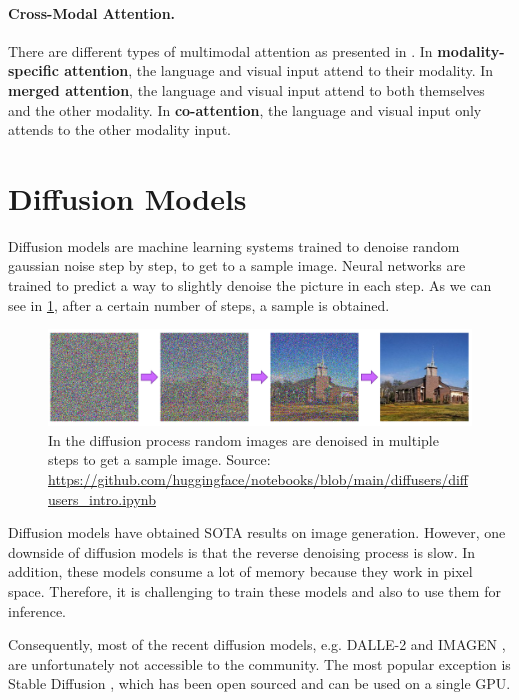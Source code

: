 \paragraph{Cross-Modal Attention.} There are different types of multimodal attention as presented in \cite{hendricks2021decoupling}. In \textbf{modality-specific attention}, the language and visual input attend to their modality. In \textbf{merged attention}, the language and visual input attend to both themselves and the other modality. In \textbf{co-attention}, the language and visual input only attends to the other modality input.

\section{Diffusion Models} \label{sec:diffusion_models}

Diffusion models are machine learning systems trained to denoise random gaussian noise step by step, to get to a sample image. Neural networks are trained to predict a way to slightly denoise the picture in each step. As we can see in \cref{fig:diffusion_process}, after a certain number of steps, a sample is obtained.

\begin{figure}[ht]
    \centering
    \includegraphics[width=\linewidth]{images/diffusion/diffusion-process.png}
    \caption{In the diffusion process random images are denoised in multiple steps to get a sample image. Source: \url{https://github.com/huggingface/notebooks/blob/main/diffusers/diffusers_intro.ipynb}}
    \label{fig:diffusion_process}
\end{figure}

Diffusion models have obtained SOTA results on image generation. However, one downside of diffusion models is that the reverse denoising process is slow. In addition, these models consume a lot of memory because they work in pixel space. Therefore, it is challenging to train these models and also to use them for inference.

Consequently, most of the recent diffusion models, e.g. DALLE-2 \cite{ramesh2022hierarchical} and IMAGEN \cite{saharia2022photorealistic}, are unfortunately not accessible to the community. The most popular exception is Stable Diffusion \cite{rombach2021highresolution}, which has been open sourced and can be used on a single GPU.

